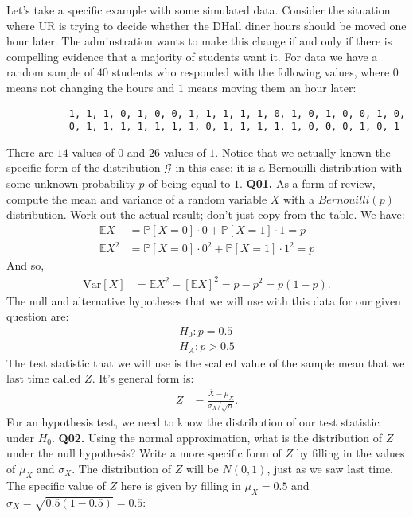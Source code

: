\documentclass[12pt]{article}
\newcommand{\Prob}{\mathbb{P}}
\newcommand{\V}{\text{Var}}
\newcommand{\cblack}{\color{Black}}
\newcommand{\cblue}{\color{MidnightBlue}}
\begin{document}
Let's take a specific example with some simulated data. Consider the
situation where UR is trying to decide whether the DHall diner hours should
be moved one hour later. The adminstration wants to make this change if and
only if there is compelling evidence that a majority of students want it. For
data we have a random sample of $40$ students who responded with the following
values, where $0$ means not changing the hours and $1$ means moving them an
hour later:
\begin{verbatim}
           1, 1, 1, 0, 1, 0, 0, 1, 1, 1, 1, 1, 0, 1, 0, 1, 0, 0, 1, 0,
           0, 1, 1, 1, 1, 1, 1, 1, 0, 1, 1, 1, 1, 1, 0, 0, 0, 1, 0, 1
\end{verbatim}
There are $14$ values of $0$ and $26$ values of $1$. Notice that we actually
known the specific form of the distribution $\mathcal{G}$ in this case: it is
a Bernouilli distribution with some unknown probability $p$ of being equal to
$1$. \textbf{Q01.} As a form of review, compute the mean and variance of a
random variable $X$ with a $Bernouilli(p)$ distribution. Work out the actual
result; don't just copy from the table. \cblue We have:
\begin{align*}
\mathbb{E}X &= \Prob[X = 0] \cdot 0 + \Prob[X = 1] \cdot 1 = p \\
\mathbb{E}X^2 &= \Prob[X = 0] \cdot 0^2 + \Prob[X = 1] \cdot 1^2 = p
\end{align*}
And so,
\begin{align*}
\V[X] &= \mathbb{E}X^2 - \left[\mathbb{E}X\right]^2 = p - p^2 = p (1 - p).
\end{align*}
\cblack The null and alternative hypotheses that we will use with this data
for our given question are:
\begin{align*}
H_0: p = 0.5 \\
H_A: p > 0.5
\end{align*}
The test statistic that we will use is the scalled value of the sample mean
that we last time called $Z$. It's general form is:
\begin{align*}
Z &= \frac{\bar{X} - \mu_X}{\sigma_X / \sqrt{n}}.
\end{align*}
For an hypothesis test, we need to know the distribution of our test 
statistic under $H_0$. \textbf{Q02.} Using the normal approximation, what
is the distribution of $Z$ under the null hypothesis? Write a more specific
form of $Z$ by filling in the values of $\mu_X$ and $\sigma_X$. \cblue The
distribution of $Z$ will be $N(0, 1)$, just as we saw last time. The specific
value of $Z$ here is given by filling in $\mu_X = 0.5$ and $\sigma_X = \sqrt{0.5 ( 1 - 0.5)} = 0.5$:
\end{document}
